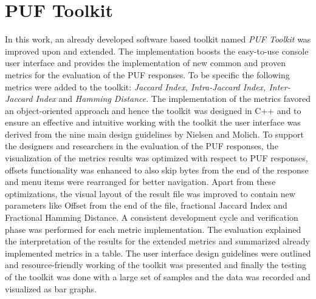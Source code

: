 \section{PUF Toolkit}
In this work, an already developed software based toolkit named \emph{PUF Toolkit} was improved upon and extended. The implementation boosts the easy-to-use console user interface and provides the implementation of new common and proven metrics for the evaluation of the PUF responses. To be specific the following metrics were added to the toolkit: \emph{Jaccard Index, Intra-Jaccard Index, Inter-Jaccard Index} and \emph{Hamming Distance}. The implementation of the metrics favored an
object-oriented approach and hence the toolkit was designed in C++ and to ensure an effective and intuitive working with the toolkit the user interface was derived from the nine main design guidelines by Nielsen and Molich\cite{67}. To support the designers and researchers in the evaluation of the PUF responses, the visualization of the metrics results was optimized with respect to PUF responses, offsets functionality was enhanced to also skip bytes from the end of the response and menu items were rearranged for better navigation. Apart from
these optimizations, the visual layout of the result file was improved to contain new parameters like Offset from the end of the file, fractional Jaccard Index and Fractional Hamming Distance. A consistent development cycle and verification phase was performed for each metric implementation. The evaluation explained the interpretation of the results for the extended metrics and summarized already implemented metrics in a table. The user interface design guidelines were outlined
and resource-friendly working of the toolkit was presented and finally the testing of the toolkit was done with a large set of samples and the data was recorded and visualized as bar graphs.\\

